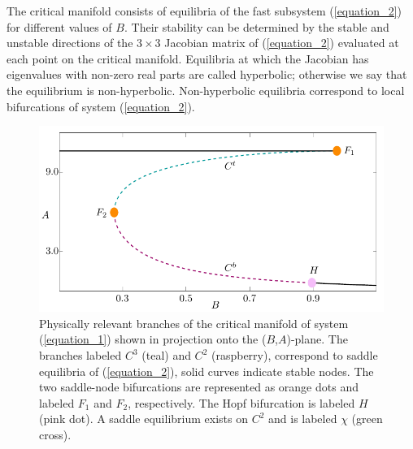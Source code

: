 \documentclass{ws-ijbc}
\begin{document}
The critical manifold consists of equilibria of the fast subsystem (\ref{equation_2}) for different values of $B$.  Their stability can be determined by the stable and unstable directions of the $3\times3$ Jacobian matrix of (\ref{equation_2}) evaluated at each point on the critical manifold.  Equilibria at which the Jacobian has eigenvalues with non-zero real parts are called hyperbolic; otherwise we say that the equilibrium is non-hyperbolic.  Non-hyperbolic equilibria correspond to local bifurcations of system (\ref{equation_2}).

\begin{figure}[!t]
\begin{center}
\includegraphics[page=1]{figures.pdf}
\end{center}
\caption{Physically relevant branches of the critical manifold of system (\ref{equation_1}) shown in projection onto the ($B$,$A$)-plane.  The branches labeled $C^3$ (teal) and $C^2$ (raspberry), correspond to saddle equilibria of (\ref{equation_2}), solid curves indicate stable nodes.  The two saddle-node bifurcations are represented as orange dots and labeled $F_1$ and $F_2$, respectively.  The Hopf bifurcation is labeled $H$ (pink dot).  A saddle equilibrium exists on $C^2$ and is labeled $\chi$ (green cross).}
\label{critical_figure}
\end{figure}
\end{document}
